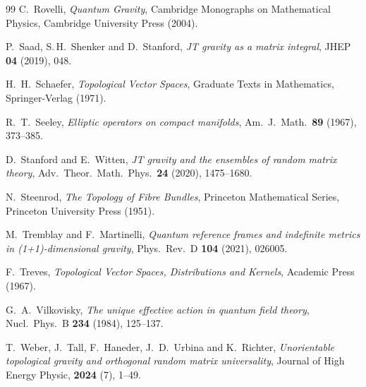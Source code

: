 \documentclass[11pt]{amsart}
\theoremstyle{definition}
\theoremstyle{remark}
\begin{document}
\begin{thebibliography}{99}
C.~Rovelli, \textit{Quantum Gravity}, Cambridge Monographs on Mathematical Physics, Cambridge University Press (2004).

P.~Saad, S.\,H.~Shenker and D.~Stanford,
\textit{JT gravity as a matrix integral},
JHEP \textbf{04} (2019), 048.

H.~H.~Schaefer,
\textit{Topological Vector Spaces},
Graduate Texts in Mathematics, Springer-Verlag (1971).

R.~T.~Seeley,
\textit{Elliptic operators on compact manifolds},
Am.\ J.\ Math.\ \textbf{89} (1967), 373–385.

D.~Stanford and E.~Witten,
\textit{JT gravity and the ensembles of random matrix theory},
Adv.\ Theor.\ Math.\ Phys.\ \textbf{24} (2020), 1475–1680.

N.~Steenrod,
\textit{The Topology of Fibre Bundles},
Princeton Mathematical Series, Princeton University Press (1951).

M.~Tremblay and F.~Martinelli,
\textit{Quantum reference frames and indefinite metrics in (1+1)-dimensional gravity},
Phys.\ Rev.\ D \textbf{104} (2021), 026005.

F.~Treves,
\textit{Topological Vector Spaces, Distributions and Kernels},
Academic Press (1967).

G.~A.~Vilkovisky,
\textit{The unique effective action in quantum field theory},
Nucl.\ Phys.\ B \textbf{234} (1984), 125–137.

T.~Weber, J.~Tall, F.~Haneder, J.~D.~Urbina and K.~Richter, 
\textit{Unorientable topological gravity and orthogonal random matrix universality}, Journal of High Energy Physic, \textbf{2024} (7), 1--49.

\end{thebibliography}
\end{document}
